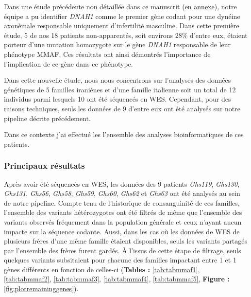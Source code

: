 \documentclass[12pt,twoside]{reedthesis}
\theoremstyle{definition}
\theoremstyle{definition}
\theoremstyle{remark}
\begin{document}
  Dans une étude précédente non détaillée dans ce manuscrit (en
  \protect\hyperlink{dnah12014}{annexe}), notre équipe a pu identifier
  \emph{DNAH1} comme le premier gène codant pour une dynéine axonèmale
  responsable uniquement d'infertilité masculine. Dans cette première
  étude, 5 de nos 18 patients non-apparentés, soit environs 28\% d'entre
  eux, étaient porteur d'une mutation homozygote sur le gène \emph{DNAH1}
  responsable de leur phénotype MMAF. Ces résultats ont ainsi démontrés
  l'importance de l'implication de ce gène dans ce phénotype.
  
  Dans cette nouvelle étude, nous nous concentrons sur l'analyses des
  données génétiques de 5 familles iraniènes et d'une famille italienne
  soit un total de 12 individus parmi lesquels 10 ont été séquencés en
  WES. Cependant, pour des raisons techniques, seuls les données de 9
  d'entre eux ont été analysés sur notre pipeline décrite précédement.
  
  Dans ce contexte j'ai effectué les l'ensemble des analyses
  bioinformatiques de ces patients.
  
  \newpage
  
  
  
  \newpage
  
  \subsubsection{Principaux résultats}\label{principaux-resultats-4}
  
  Après avoir été séquencés en WES, les données des 9 patients
  \emph{Ghs119}, \emph{Ghs130}, \emph{Ghs131}, \emph{Ghs56}, \emph{Ghs58},
  \emph{Ghs59}, \emph{Ghs60}, \emph{Ghs62} et \emph{Ghs63} ont été
  analysés au sein de notre pipeline. Compte tenu de l'historique de
  consanguinité de ces familles, l'ensemble des variants hétérozygotes ont
  été filtrés de même que l'ensemble des variants observés fréquement dans
  la population générale et ceux n'ayant aucun impacte sur la séquence
  codante. Aussi, dans les cas où les données de WES de plusieurs frères
  d'une même famille étaient disponibles, seuls les variants partagés par
  l'ensemble des frères furent gardés. À l'issus de cette étape de
  filtrage, seuls quelques variants subsitaient pour chacune des familles
  impactant entre 1 et 1 gènes différents en fonction de celles-ci
  (\textbf{Tables :} \ref{tab:tabmmaf1}, \ref{tab:tabmmaf2},
  \ref{tab:tabmmaf3}, \ref{tab:tabmmaf4}, \ref{tab:tabmmaf5},
  \textbf{Figure : }\ref{fig:plotremaininggenes}).
  
\end{document}
